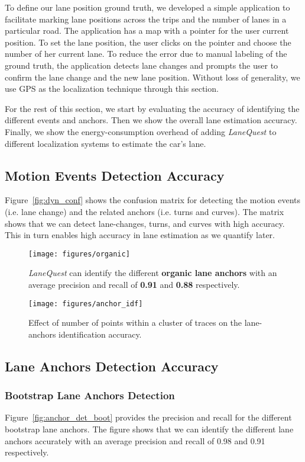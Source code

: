 \documentclass[10pt, conference, compsocconf]{IEEEtran}
\def \sys {\textit{LaneQuest}}
\newcommand{\figscale}{0.7}
\begin{document}
To define our lane position ground truth, we developed a simple application to facilitate marking lane positions across the trips and the number of lanes in a particular road. The application has a map with a pointer for the user current position. To set the lane position, the user clicks on the pointer and choose the number of her current lane. To reduce the error due to manual labeling of the ground truth, the application detects lane changes and prompts the user to confirm the lane change and the new lane position. Without loss of generality, we use GPS as the localization technique through this section.

For the rest of this section, we start by evaluating the accuracy of identifying the different events and anchors. Then we show the overall lane estimation accuracy. Finally, we show the energy-consumption overhead of adding \sys{} to different localization systems to estimate the car's lane.

\subsection{Motion Events Detection Accuracy}
Figure~\ref{fig:dyn_conf} shows the confusion matrix for detecting the motion events (i.e. lane change) and the related anchors (i.e. turns and curves). The matrix shows that we can detect lane-changes, turns, and curves with high accuracy. This in turn enables high accuracy in lane estimation as we quantify later.
\begin{figure}[!t]
\centering
\texttt{[image: figures/organic]}
\caption{\sys{} can identify the different \textbf{organic lane anchors} with an average precision and recall of \textbf{0.91} and \textbf{0.88} respectively.}
\label{fig:anchor_det_org}
\end{figure}
\begin{figure}[!t]
\centering
\texttt{[image: figures/anchor\_idf]}
\caption{Effect of number of points within a cluster of traces on the lane-anchors identification accuracy.}
\label{fig:bump_idf}
\end{figure}
\subsection{Lane Anchors Detection Accuracy}
\subsubsection{Bootstrap Lane Anchors Detection}
Figure~\ref{fig:anchor_det_boot} provides the precision and recall for the different bootstrap lane anchors. The figure shows that we can identify the different lane anchors accurately with an average precision and recall of 0.98 and 0.91 respectively.
\end{document}
